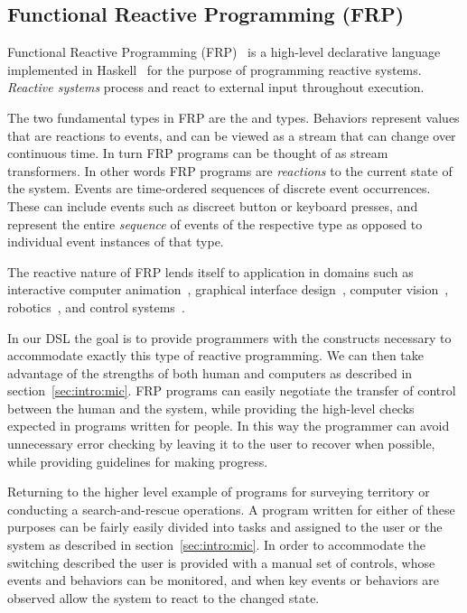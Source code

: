 \documentclass{sig-alternate-05-2015}
\begin{document}

\subsection{Functional Reactive Programming (FRP)}
\label{sec:intro:frp}

Functional Reactive Programming (FRP)~\cite{H00haskell,WH00frp} is a
high-level declarative language implemented in Haskell~\cite{Hea92report} for
the purpose of programming reactive systems. \emph{Reactive systems} process
and react to external input throughout execution.

The two fundamental types in FRP are the  and 
types. Behaviors represent values that are reactions to events, and can be
viewed as a stream that can change over continuous time. In turn FRP programs
can be thought of as stream transformers. In other words FRP programs are
\emph{reactions} to the current state of the system. Events are time-ordered
sequences of discrete event occurrences. These can include events such as
discreet button or keyboard presses, and represent the entire \emph{sequence}
of events of the respective type as opposed to individual event instances of
that type.

The reactive nature of FRP lends itself to application in domains such as
interactive computer animation~\cite{EH97functional}, graphical interface
design~\cite{CE01genuinely}, computer vision~\cite{RPHH99prototyping},
robotics~\cite{PHH99language}, and control systems~\cite{WTH02event}.

In our DSL the goal is to provide programmers with the constructs necessary to
accommodate exactly this type of reactive programming. We can then take
advantage of the strengths of both human and computers as described in
section~\ref{sec:intro:mic}. FRP programs can easily negotiate the transfer of
control between the human and the system, while providing the high-level
checks expected in programs written for people. In this way the programmer can
avoid unnecessary error checking by leaving it to the user to recover when
possible, while providing guidelines for making progress.

Returning to the higher level example of programs for surveying territory or
conducting a search-and-rescue operations. A program written for either of
these purposes can be fairly easily divided into tasks and assigned to the
user or the system as described in section~\ref{sec:intro:mic}. In order to
accommodate the switching described the user is provided with a manual set of
controls, whose events and behaviors can be monitored, and when key events
or behaviors are observed allow the system to react to the changed state.
\end{document}

